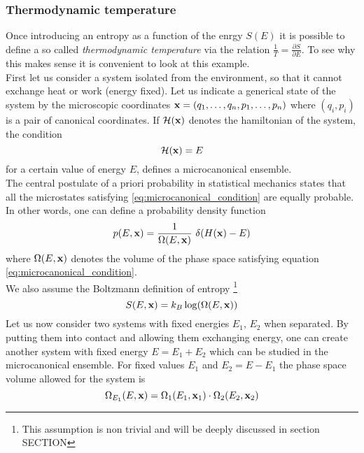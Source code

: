 \subsubsection*{Thermodynamic temperature}
Once introducing an entropy as a function of the enrgy $S(E)$ it is possible to define a so called \emph{thermodynamic temperature} via the relation $\frac{1}{T} = \frac{\partial S}{\partial E}$.
To see why this makes sense it is convenient to look at this example. \\
First let us consider a system isolated from the environment, so that it cannot exchange heat or work (energy fixed). Let us indicate a generical
state of the system by the microscopic coordinates $\mathbf{x} = (q_1, \dots, q_n, p_1, \dots, p_n)$ where $(q_i, p_i)$ is a pair of canonical coordinates. If $\mathcal{H}(\mathbf{x})$ denotes the hamiltonian of the system,
the condition
\begin{equation}
    \mathcal{H}(\mathbf{x}) = E
    \label{eq:microcanonical_condition}
\end{equation}    
for a certain value of energy $E$, defines a microcanonical ensemble. \\
The central postulate of a priori probability in statistical mechanics states that all the microstates satisfying \ref{eq:microcanonical_condition} are equally probable. In other words, one can
define a probability density function
\begin{equation*}
    p(E, \mathbf{x}) = \frac{1}{\Omega(E, \mathbf{x})} \ \delta(H(\mathbf{x}) - E)
\end{equation*}
where $\Omega(E, \mathbf{x})$ denotes the volume of the phase space satisfying equation \ref{eq:microcanonical_condition}. \\
We also assume the Boltzmann definition of entropy \footnote{This assumption is non trivial and will be deeply discussed in section SECTION}
\begin{equation}
    S(E, \mathbf{x}) = k_B \log(\Omega(E, \mathbf{x}))
    \label{eq:Boltzmann_entropy}
\end{equation}
Let us now consider two systems with fixed energies $E_1$, $E_2$ when separated. By putting them into contact and allowing them exchanging energy, one can create another system 
with fixed energy $E = E_1 + E_2$ which can be studied in the microcanonical ensemble.
For fixed values $E_1$ and $E_2 = E - E_1$ the phase space volume allowed for the system is 
\begin{equation*} 
    \Omega_{E_1}(E, \mathbf{x}) = \Omega_1(E_1, \mathbf{x}_1) \cdot \Omega_2(E_2, \mathbf{x}_2)
\end{equation*}
